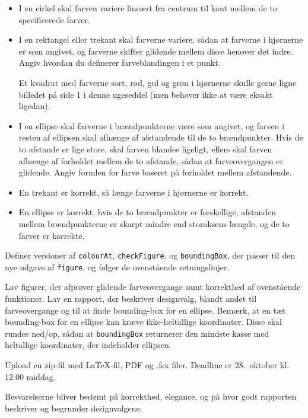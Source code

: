 \documentclass[a4paper]{article}
\begin{document}
\begin{itemize}
\item I en cirkel skal farven variere lineært fra centrum til kant
  mellem de to specificerede farver.

\item I en rektangel eller trekant skal farverne variere, sådan at
  farverne i hjørnerne er som angivet, og farverne skifter glidende
  mellem disse henover det indre.  Angiv hvordan du definerer
  farveblandingen i et punkt.

  Et kvadrat med farverne sort, rød, gul og grøn i hjørnerne skulle
  gerne ligne billedet på side 1 i denne ugeseddel (men behøver ikke
  at være eksakt ligedan).

\item I en ellipse skal farverne i brændpunkterne være som angivet, og
  farven i resten af ellipsen skal afhænge af afstandende til de to
  brændpunkter.  Hvis de to afstande er lige store, skal farven
  blandes ligeligt, ellers skal farven afhænge af forholdet mellem de
  to afstande, sådan at farveovergangen er glidende.  Angiv formlen
  for farve baseret på forholdet mellem afstandende.

\item En trekant er korrekt, så længe farverne i hjørnerne er korrekt.

\item En ellipse er korrekt, hvis de to brændpunkter er forskellige,
  afstanden mellem brændpunkterne er skarpt mindre end storaksens
  længde, og de to farver er korrekte.

\end{itemize}

\noindent
Definer versioner af \texttt{colourAt}, \texttt{checkFigure}, og
\texttt{boundingBox}, der passer til den nye udgave af
\texttt{figure}, og følger de ovenstående retningslinjer.

Lav figurer, der afprøver glidende farveovergange samt korrekthed af
ovenstående funktioner.  Lav en rapport, der beskriver designvalg,
blandt andet til farveovergange og til at finde bounding-box for en
ellipse.  Bemærk, at en tæt bounding-box for en ellipse kan kræve
ikke-heltallige koordinater.  Disse skal rundes ned/op, sådan at
\texttt{boundingBox} returnerer den mindste kasse med heltallige
koordinater, der indeholder ellipsen.

Upload en zip-fil med \LaTeX-fil, PDF og .fsx filer.  Deadline er
28.\ oktober kl. 12.00 middag.

Besvarelserne bliver bedømt på korrekthed, elegance, og på hvor godt
rapporten beskriver og begrunder designvalgene.
\end{document}
